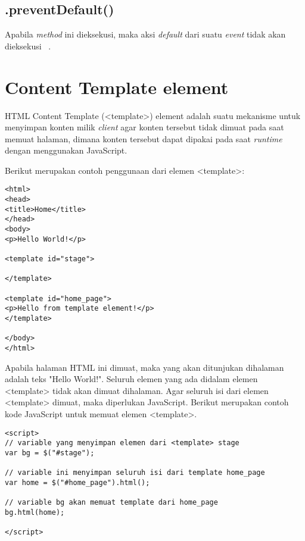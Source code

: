 \subsection{.preventDefault()}
Apabila \textit{method} ini dieksekusi, maka aksi \textit{default} dari suatu \textit{event} tidak akan dieksekusi ~\cite{jQueryAPI}.

\section{Content Template element}
\label{sec:template}

HTML Content Template (<template>) element adalah suatu mekanisme untuk menyimpan konten milik \textit{client} agar konten tersebut tidak dimuat pada saat memuat halaman, dimana konten tersebut dapat dipakai pada saat \textit{runtime} dengan menggunakan JavaScript. 

Berikut merupakan contoh penggunaan dari elemen <template>:

\begin{lstlisting}
<html>
<head>
<title>Home</title>
</head>
<body>
<p>Hello World!</p>

<template id="stage">

</template>

<template id="home_page">
<p>Hello from template element!</p>
</template>

</body>
</html>
\end{lstlisting}

Apabila halaman HTML ini dimuat, maka yang akan ditunjukan dihalaman adalah teks "Hello World!". Seluruh elemen yang ada didalam elemen <template> tidak akan dimuat dihalaman. Agar seluruh isi dari elemen <template> dimuat, maka diperlukan JavaScript. Berikut merupakan contoh kode JavaScript untuk memuat elemen <template>.

\begin{lstlisting}
<script>
// variable yang menyimpan elemen dari <template> stage
var bg = $("#stage");

// variable ini menyimpan seluruh isi dari template home_page
var home = $("#home_page").html();

// variable bg akan memuat template dari home_page
bg.html(home);

</script>
\end{lstlisting}

